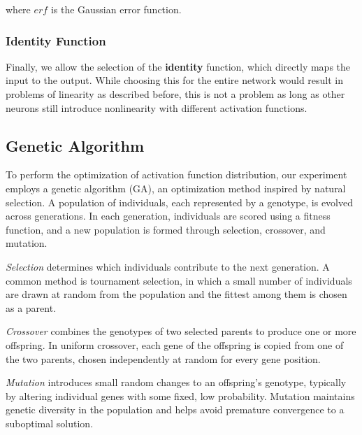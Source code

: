 where $erf$ is the Gaussian error function.

\subsubsection{Identity Function}

Finally, we allow the selection of the \textbf{identity} function, which
directly maps the input to the output.  While choosing this for the entire
network would result in problems of linearity as described before, this is
not a problem as long as other neurons still introduce nonlinearity with
different activation functions.

\clearpage
\subsection{Genetic Algorithm}
\label{sec:genetic_algorithm}

To perform the optimization of activation function distribution, our
experiment employs a genetic algorithm (GA), an optimization method inspired
by natural selection. A population of individuals, each represented by a
genotype, is evolved across generations. In each generation, individuals are
scored using a fitness function, and a new population is formed through
selection, crossover, and mutation.

\emph{Selection} determines which individuals contribute to the next
generation. A common method is tournament selection, in which a small
number of individuals are drawn at random from the population and the
fittest among them is chosen as a parent.

\emph{Crossover} combines the genotypes of two selected parents to produce
one or more offspring. In uniform crossover, each gene of the offspring is
copied from one of the two parents, chosen independently at random for
every gene position.

\emph{Mutation} introduces small random changes to an offspring's genotype,
typically by altering individual genes with some fixed, low probability.
Mutation maintains genetic diversity in the population and helps avoid
premature convergence to a suboptimal solution.
